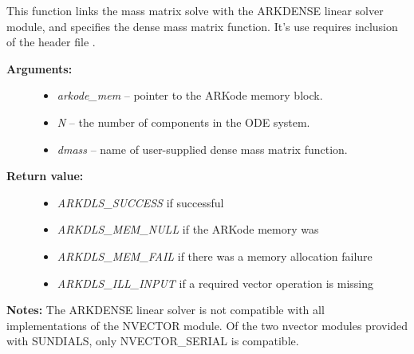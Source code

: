 \documentclass[letterpaper,10pt,english]{sphinxmanual}
\begin{document}
\begin{fulllineitems}
\label{c_interface/User_callable:ARKMassDense}
This function links the mass matrix solve with the ARKDENSE linear
solver module, and specifies the dense mass matrix function.  It's
use requires inclusion of the header file .
\begin{description}
\item[{\textbf{Arguments:}}] \leavevmode\begin{itemize}
\item {} 
\emph{arkode\_mem} -- pointer to the ARKode memory block.

\item {} 
\emph{N} -- the number of components in the ODE system.

\item {} 
\emph{dmass} -- name of user-supplied dense mass matrix function.

\end{itemize}

\item[{\textbf{Return value:}}] \leavevmode\begin{itemize}
\item {} 
\emph{ARKDLS\_SUCCESS}   if successful

\item {} 
\emph{ARKDLS\_MEM\_NULL}  if the ARKode memory was 

\item {} 
\emph{ARKDLS\_MEM\_FAIL}  if there was a memory allocation failure

\item {} 
\emph{ARKDLS\_ILL\_INPUT} if a required vector operation is missing

\end{itemize}

\end{description}

\textbf{Notes:}  The ARKDENSE linear solver is not compatible with all
implementations of the NVECTOR module. Of the two nvector modules
provided with SUNDIALS, only NVECTOR\_SERIAL is compatible.

\end{fulllineitems}

\end{document}
